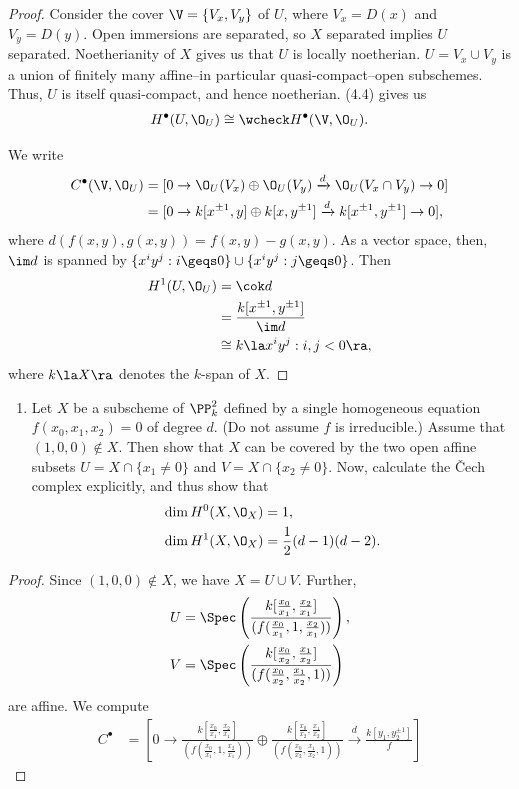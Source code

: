 \documentclass[12pt]{amsart}
\begin{document}
\begin{proof}
  Consider the cover $\V= \{V_x,V_y\}$ of $U$, where $V_x = D(x)$ and $V_y=D(y)$.
  Open immersions are separated, so $X$ separated implies $U$ separated.
  Noetherianity of $X$ gives us that $U$ is locally noetherian.
  $U=V_x\cup V_y$ is a union of finitely many affine--in particular quasi-compact--open subschemes.
  Thus, $U$ is itself quasi-compact, and hence noetherian.
  (4.4) gives us
  \begin{align*}
    H^\bullet(U,\O_U)\cong \wcheck H^\bullet(\V,\O_U).
  \end{align*}

  We write
  \begin{align*}
    C^\bullet(\V,\O_U)
    &= [0\to \O_U(V_x)\oplus \O_U(V_y)\xrightarrow{d} \O_U(V_x\cap V_y)\to 0] \\
    &= [0\to k[x^{\pm 1},y]\oplus k[x,y^{\pm1}]\xrightarrow{d}k[x^{\pm1},y^{\pm1}]\to 0],
  \end{align*}
  where $d(f(x,y),g(x,y)) = f(x,y)-g(x,y)$.
  As a vector space, then, $\im d$ is spanned by $\{x^iy^j:i\geqs 0\}\cup \{x^iy^j:j\geqs 0\}$.
  Then
  \begin{align*}
    H^1(U,\O_U) 
    &=\cok d \\
    &= \frac{k[x^{\pm1},y^{\pm1}]}{\im d} \\
    &\cong k\la x^iy^j :i,j<0\ra,
  \end{align*}
  where $k\la X\ra$ denotes the $k$-span of $X$.
\end{proof}

\begin{enumerate}
  \item[4.7.] {
      Let $X$ be a subscheme of $\PP_k^2$ defined by a single homogeneous equation $f(x_0,x_1,x_2)=0$ of degree $d$.
      (Do not assume $f$ is irreducible.)
      Assume that $(1,0,0)\notin X$.
      Then show that $X$ can be covered by the two open affine subsets $U=X\cap \{x_1\neq 0\}$ and $V=X\cap \{x_2\neq 0\}$.
      Now, calculate the \v{C}ech complex explicitly, and thus show that
      \begin{align*}
        &\dim H^0(X,\O_X)=1, \\
        &\dim H^1(X,\O_X)=\frac12(d-1)(d-2).
      \end{align*}
    }
\end{enumerate}

\begin{proof}
  Since $(1,0,0)\notin X$, we have $X=U\cup V$.
  Further, 
  \begin{align*}
    U &= \Spec\left(\frac{k[\frac{x_0}{x_1},\frac{x_2}{x_1}]}{(f(\frac{x_0}{x_1},1,\frac{x_2}{x_1}))}\right), \\
    V &= \Spec\left(\frac{k[\frac{x_0}{x_2},\frac{x_1}{x_2}]}{(f(\frac{x_0}{x_2},\frac{x_1}{x_2},1))}\right)
  \end{align*}
  are affine.
  We compute
  \begin{align*}
    C^\bullet &= \left[0\to \frac{k[\frac{x_0}{x_1},\frac{x_2}{x_1}]}{(f(\frac{x_0}{x_1},1,\frac{x_2}{x_1}))}\oplus \frac{k[\frac{x_0}{x_2},\frac{x_1}{x_2}]}{(f(\frac{x_0}{x_2},\frac{x_1}{x_2},1))}\xrightarrow{d} \frac{k[y_1,y_2^{\pm1}]}{f} \right]
  \end{align*}
\end{proof}
\end{document}
